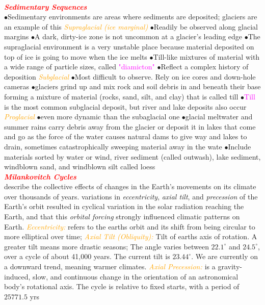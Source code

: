 \documentclass{article}
\newcommand{\ddd}{$\bullet$}
\newcommand{\red}[1]{\textcolor{red}{#1}}
\newcommand{\pink}[1]{\textcolor{magenta}{#1}}
\newcommand{\orange}[1]{\textcolor{orange}{#1}}
\newcommand{\mysection}[1]{\\ \textbf{\textit{\red{#1}}} \\}
\newcommand{\mysub}[1]{{\textit{\orange{#1}}}}
\newcommand{\vocab}[1]{{\pink{#1}}}
\begin{document}
\begin{multicols*}{4}
        \mysection{Sedimentary Sequences}
        \ddd Sedimentary environments are areas where sediments are deposited; glaciers are an example of this
        \mysub{Supraglacial (ice marginal)}
            \ddd Readily be observed along glacial margins
            \ddd A dark, dirty-ice zone is not uncommon at a glacier’s leading edge
            \ddd The supraglacial environment is a very unstable place because material deposited on top of ice is going to move when the ice melts
            \ddd Till-like mixtures of material with a wide range of particle sizes, called \vocab{"diamicton"}
            \ddd Reflect a complex history of deposition
        \mysub{Subglacial}
            \ddd Most difficult to observe. Rely on ice cores and down-hole cameras 
            \ddd glaciers grind up and mix rock and soil debris in and beneath their base forming a mixture of material (rocks, sand, silt, and clay) that is called till
            \ddd \vocab{Till} is the most common subglacial deposit, but river and lake deposits also occur 
        \mysub{Proglacial}
            \ddd even more dynamic than the subaglacial one
            \ddd glacial meltwater and summer rains carry debris away from the glacier or deposit it in lakes that come and go as the force of the water causes natural dams to give way and lakes to drain, sometimes catastrophically sweeping material away in the wate
            \ddd Include materials sorted by water or wind, river sediment (called outwash), lake sediment, windblown sand, and windblown silt called loess
        \mysection{Milankovitch Cycles}
         describe the collective effects of changes in the Earth's movements on its climate over thousands of years. variations in \textit{eccentricity}, \textit{axial tilt}, and \textit{precession} of the Earth's orbit resulted in cyclical variation in the solar radiation reaching the Earth, and that this \textit{orbital forcing} strongly influenced climatic patterns on Earth.
         \mysub{Eccentricity:} refers to the earths orbit and its shift from being circular to more elliptical over time;
        \mysub{Axial Tilt (Obliquity): }Tilt of earths axis of rotation. A greater tilt means more drastic seasons; The angle varies between $22.1^\circ$ and $24.5^\circ$, over a cycle of about 41,000 years. The current tilt is $23.44^\circ$. We are currently on a downward trend, meaning warmer climates.
        \mysub{Axial Precession: } is a gravity-induced, slow, and continuous change in the orientation of an astronomical body's rotational axis. The cycle is relative to fixed starts, with a period of $25771.5$ yrs

\end{multicols*}
\end{document}
